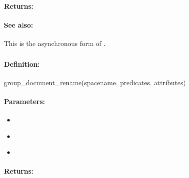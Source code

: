 \paragraph{Returns:}


\paragraph{See also:}  This is the asynchronous form of .

\pagebreak
\subsubsection{}
\label{api:ruby:group_document_rename}


\paragraph{Definition:}
\begin{rubycode}
group_document_rename(spacename, predicates, attributes)
\end{rubycode}

\paragraph{Parameters:}
\begin{itemize}[noitemsep]
\item {}\\

\item {}\\

\item {}\\

\end{itemize}

\paragraph{Returns:}


\pagebreak
\subsubsection{}
\label{api:ruby:async_group_document_rename}


